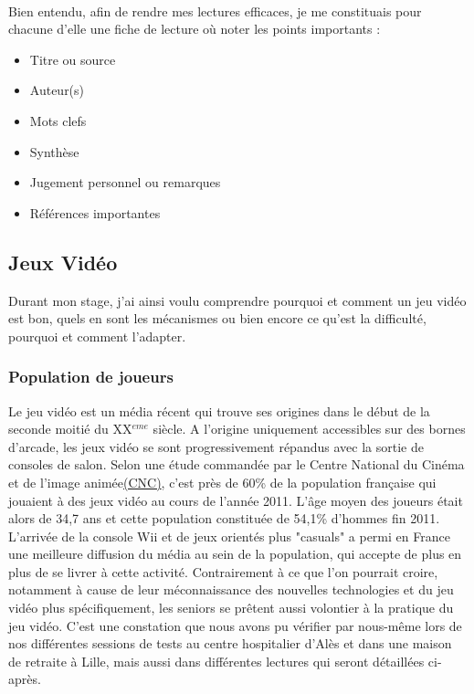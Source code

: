 \paragraph{}Bien entendu, afin de rendre mes lectures efficaces, je me constituais pour chacune d'elle une fiche de lecture où noter les points importants : 
\begin{itemize}
	\item Titre ou source
	\item Auteur(s)
	\item Mots clefs
	\item Synthèse
	\item Jugement personnel ou remarques
	\item Références importantes
\end{itemize}

	\subsection{Jeux Vidéo}
Durant mon stage, j'ai ainsi voulu comprendre pourquoi et comment un jeu vidéo est bon, quels en sont les mécanismes ou bien encore ce qu'est la difficulté, pourquoi et comment l'adapter.

		\subsubsection*{Population de joueurs}
Le jeu vidéo est un média récent qui trouve ses origines dans le début de la seconde moitié du XX$^{eme}$ siècle. A l'origine uniquement accessibles sur des bornes d'arcade, les jeux vidéo se sont progressivement répandus avec la sortie de consoles de salon. Selon une étude commandée par le Centre National du Cinéma et de l'image animée\href{http://www.cnc.fr}{(CNC)}, c'est près de 60\% de la population française qui jouaient à des jeux vidéo au cours de l'année 2011\cite{Cnc11}. L'âge moyen des joueurs était alors de 34,7 ans et cette population constituée de 54,1\% d'hommes fin 2011\cite{Cnc11}. L'arrivée de la console Wii et de jeux orientés plus "casuals" a permi en France une meilleure diffusion du média au sein de la population, qui accepte de plus en plus de se livrer à cette activité. Contrairement à ce que l'on pourrait croire, notamment à cause de leur méconnaissance des nouvelles technologies et du jeu vidéo plus spécifiquement, les seniors se prêtent aussi volontier à la pratique du jeu vidéo. C'est une constation que nous avons pu vérifier par nous-même lors de nos différentes sessions de tests au centre hospitalier d'Alès et dans une maison de retraite à Lille, mais aussi dans différentes lectures qui seront détaillées ci-après.

